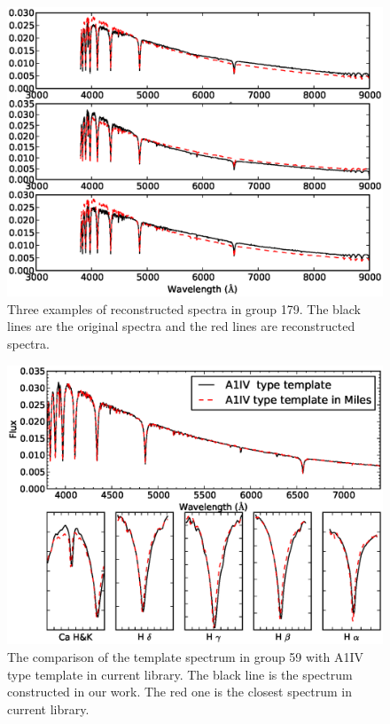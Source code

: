 \documentclass[manuscript]{aastex}
\begin{document}
 \begin{figure}
   \centering
   \includegraphics[width=14cm, angle=0,clip]{f82.eps}
   \caption{Three examples of reconstructed spectra in group 179.
The black lines are the original spectra and the red lines are reconstructed spectra.
   }
   \label{Fig82}
\end{figure}
\begin{figure}
   \centering
   \includegraphics[width=14cm, angle=0,clip]{f92.eps}
   \caption{The comparison of the template spectrum in group 59 with  A1IV type template in current library.
The black line is the spectrum constructed in our work.
The red one is the closest spectrum in current library.
   }
   \label{Fig92}
\end{figure}
\end{document}
